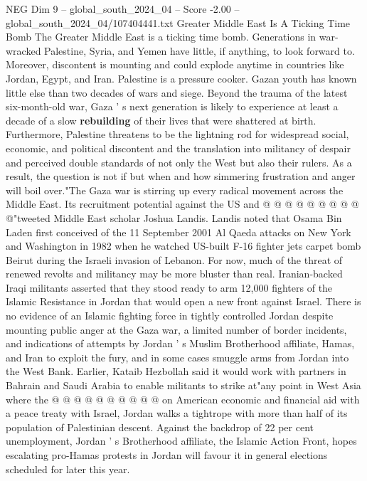 \begin{textsample}{NEG Dim 9 – global\_south\_2024\_04 – Score -2.00 – global\_south\_2024\_04/107404441.txt}  \label{ex:f9_neg_377}
Greater Middle East Is A Ticking Time Bomb The Greater Middle East is a ticking time bomb.
Generations in war-wracked Palestine, Syria, and Yemen have little, if anything, to look forward to.
Moreover, discontent is mounting and could explode anytime in countries like Jordan, Egypt, and Iran.
Palestine is a pressure cooker.
Gazan youth has known little else than two decades of wars and siege.
Beyond the trauma of the latest six-month-old war, Gaza ' s next generation is likely to experience at least a decade of a slow \textbf{rebuilding} of their lives that were shattered at birth.
Furthermore, Palestine threatens to be the lightning rod for widespread social, economic, and political discontent and the translation into militancy of despair and perceived double standards of not only the West but also their rulers.
As a result, the question is not if but when and how simmering frustration and anger will boil over."The Gaza war is stirring up every radical movement across the Middle East.
Its recruitment potential against the US and @ @ @ @ @ @ @ @ @ @"tweeted Middle East scholar Joshua Landis.
Landis noted that Osama Bin Laden first conceived of the 11 September 2001 Al Qaeda attacks on New York and Washington in 1982 when he watched US-built F-16 fighter jets carpet bomb Beirut during the Israeli invasion of Lebanon.
For now, much of the threat of renewed revolts and militancy may be more bluster than real.
Iranian-backed Iraqi militants asserted that they stood ready to arm 12,000 fighters of the Islamic Resistance in Jordan that would open a new front against Israel.
There is no evidence of an Islamic fighting force in tightly controlled Jordan despite mounting public anger at the Gaza war, a limited number of border incidents, and indications of attempts by Jordan ' s Muslim Brotherhood affiliate, Hamas, and Iran to exploit the fury, and in some cases smuggle arms from Jordan into the West Bank.
Earlier, Kataib Hezbollah said it would work with partners in Bahrain and Saudi Arabia to enable militants to strike at"any point in West Asia where the @ @ @ @ @ @ @ @ @ @ on American economic and financial aid with a peace treaty with Israel, Jordan walks a tightrope with more than half of its population of Palestinian descent.
Against the backdrop of 22 per cent unemployment, Jordan ' s Brotherhood affiliate, the Islamic Action Front, hopes escalating pro-Hamas protests in Jordan will favour it in general elections scheduled for later this year.

\end{textsample}

